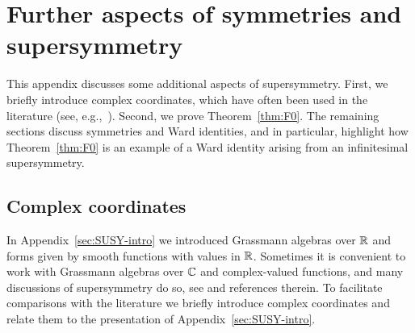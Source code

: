 \documentclass[11pt,a4paper]{article}
\begin{document}
\section{Further aspects of symmetries and supersymmetry}
\label{sec:fSUSY}

This appendix discusses some additional aspects of
supersymmetry. First, we briefly introduce complex coordinates, which
have often been used in the literature  (see, e.g.,~\cite{MR2525670}).
Second, we prove Theorem~\ref{thm:F0}. The remaining sections
discuss symmetries and Ward identities, and in particular,
highlight how Theorem~\ref{thm:F0} is an example of a Ward
identity arising from an infinitesimal supersymmetry.


\subsection{Complex coordinates}
\label{sec:CC}


In Appendix~\ref{sec:SUSY-intro} we introduced Grassmann algebras over $\mathbb{R}$
and forms given by smooth functions with values in $\mathbb{R}$. Sometimes it
is convenient to work with Grassmann algebras over $\mathbb{C}$ and
complex-valued functions, and many discussions of supersymmetry do so,
see \cite{MR2525670} and references therein. To facilitate comparisons
with the literature we briefly introduce complex coordinates and
relate them to the presentation of Appendix~\ref{sec:SUSY-intro}.
\end{document}
